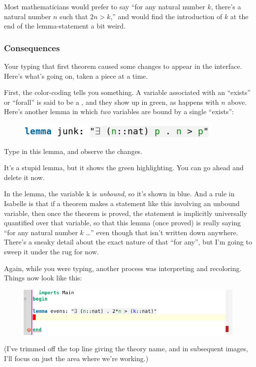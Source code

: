 Most mathematicians would prefer to say ``for any natural number $k$, there's a natural number $n$ such that $2n > k$,'' and would find the introduction of $k$ at the end of the lemma-statement a bit weird. 

\subsubsection{Consequences}
Your typing that first theorem caused some changes to appear in the interface. Here's what's going on, taken a piece at a time.

First, the color-coding tells you something. A variable associated with an ``exists'' or ``forall'' is said to be a , and they show up in green, as happens with $n$ above. Here's another lemma in which \textit{two} variables are bound by a single ``exists'':
\begin{figure}[h]
    \includegraphics[width=0.5\linewidth]{C01/Images/junk-lemma.png}
\end{figure}

\task
Type in this lemma, and observe the changes. 

It's a stupid lemma, but it shows the green highlighting. You can go ahead and delete it now. 
\etask

In the  lemma, the variable k is \textit{unbound}, so it's shown in blue. And a rule in Isabelle is that if a theorem makes a statement like this involving an unbound variable, then once the theorem is proved, the statement is implicitly universally quantified over that variable, so that this lemma (once proved) is really saying ``for any natural number $k$ \ldots'' even though that isn't written down anywhere. There's a sneaky detail about the exact nature of that ``for any'', but I'm going to sweep it under the rug for now. 

Again, while you were typing, another process was interpreting and recoloring. Things now look like this:
\begin{figure}[ht]
    \includegraphics[width=0.75\linewidth]{C01/Images/unproved-lemma.png}
\end{figure}
\newpage
(I've trimmed off the top line giving the theory name, and in subsequent images, I'll focus on just the area where we're working.)

